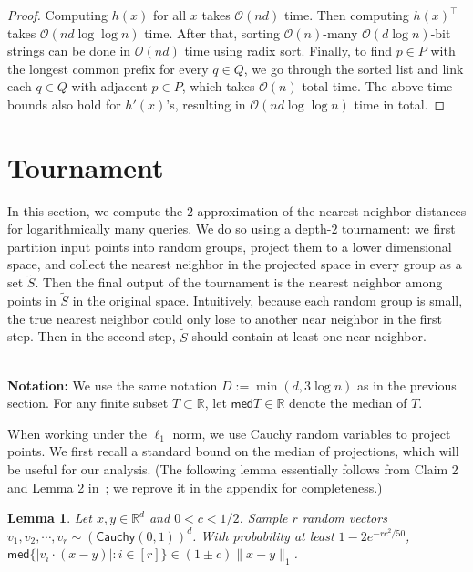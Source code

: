 \documentclass[11pt]{article}
\newcommand{\med}{\mathsf{med}}
\theoremstyle{plain}
\newtheorem{lem}[theorem]{Lemma}
\newcommand{\OO}{\mathcal{O}}
\newcommand{\R}{\mathbb{R}}
\begin{document}
\begin{proof}
Computing $h(x)$ for all $x$ takes $\OO(nd)$ time. Then computing $h(x)^\top$ takes $\OO(nd \log \log n)$ time. After that, sorting $\OO(n)$-many $\OO(d\log n)$-bit strings can be done in $\OO(nd)$ time using radix sort. Finally, to find $p \in P$ with the longest common prefix for every $q \in Q$, we go through the sorted list and link each $q \in Q$ with adjacent $p \in P$, which takes $\OO(n)$ total time. The above time bounds also hold for $h'(x)$'s, resulting in $\OO(nd \log\log n)$ time in total.
    
\end{proof} \section{Tournament}
\label{s:tour}
In this section, we compute the $2$-approximation of the nearest neighbor distances for logarithmically many queries. We do so using a depth-$2$ tournament: we first partition input points into random groups, project them to a lower dimensional space, and collect the nearest neighbor in the projected space in every group as a set $\tilde{S}$. Then the final output of the tournament is the nearest neighbor among points in $\tilde{S}$ in the original space. Intuitively, because each random group is small,  the true nearest neighbor could only lose to another near neighbor in the first step. Then in the second step, $\tilde{S}$ should contain at least one near neighbor.

\ \\
{\bf Notation:} We use the same notation ${{D}} := \min{(d, 3\log n)}$ as in the previous section. For any finite subset $T \subset \R$, let $\med T \in \R$ denote the median of $T$.

When working under the $\ell_1$ norm, we use Cauchy random variables to project points. We first recall a standard bound on the median of projections, which will be useful for our analysis. (The following lemma essentially follows from Claim 2 and Lemma 2 in~\cite{indyk2006stable}; we reprove it in the appendix for completeness.)

\begin{lem}\label{Lemma:comparison}
    Let $x, y \in \R^d$ and $0 < c <1/2$. Sample $r$ random vectors $v_1, v_2, \cdots, v_r \sim (\mathsf{Cauchy}(0, 1))^d$. With probability at least $1 -2e^{-rc^2/50}$, $\med\{|v_i \cdot (x -y) | : i \in [r]\} \in (1\pm c) \lVert x - y\rVert_1$.
\end{lem}
\end{document}
